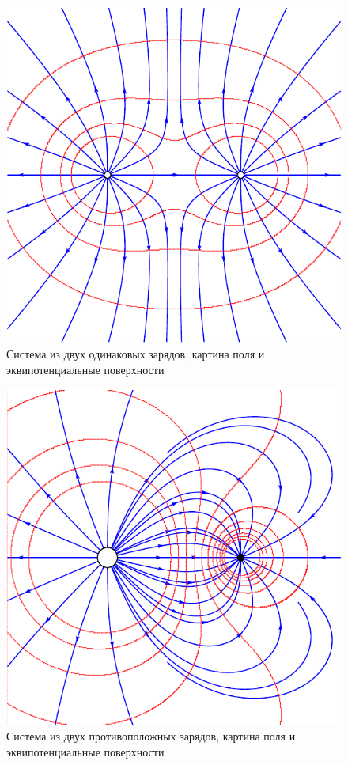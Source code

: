 		\begin{figure}[h!]
			\centering
			\includegraphics[scale=0.75]{./img/fig17/fig17.pdf}
			\caption{Система из двух одинаковых зарядов, картина поля и эквипотенциальные поверхности}
		\end{figure}
			\begin{figure}[h!]
			\centering
			\includegraphics[scale=0.75]{./img/fig18/fig18.pdf}
			\caption{Система из двух противоположных зарядов, картина поля и эквипотенциальные поверхности}
		\end{figure}
